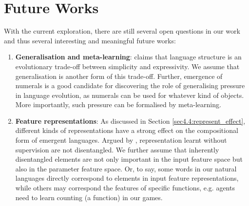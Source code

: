 \section{Future Works}
\label{sec5.2:future_work}

With the current exploration, there are still several open questions in our work and thus several interesting and meaningful future works:

\begin{enumerate}
    \item \textbf{Generalisation and meta-learning}: \cite{smith2013linguistic} claims that language structure is an evolutionary trade-off between simplicity and expressivity. We assume that generalisation is another form of this trade-off. Further, emergence of numerals is a good candidate for discovering the role of generalising pressure in language evolution, as numerals can be used for whatever kind of objects. More importantly, such pressure can be formalised by meta-learning.
    \item \textbf{Feature representations}: As discussed in Section \ref{sec4.4:represent_effect}, different kinds of representations have a strong effect on the compositional form of emergent languages. Argued by \cite{locatello2018challenging}, representation learnt without supervision are not disentangled. We further assume that inherently disentangled elements are not only important in the input feature space but also in the parameter feature space. Or, to say, some words in our natural languages directly correspond to elements in input feature representations, while others may correspond the features of specific functions, e.g. agents need to learn counting (a function) in our games.
\end{enumerate}